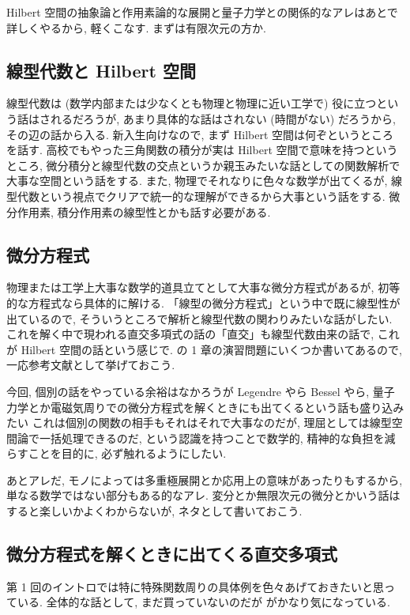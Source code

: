 \documentclass[openany, a4paper, oneside]{jsbook}
\begin{document}
Hilbert 空間の抽象論と作用素論的な展開と量子力学との関係的なアレはあとで詳しくやるから, 軽くこなす.
まずは有限次元の方か.
\subsection{線型代数と Hilbert 空間}

線型代数は (数学内部または少なくとも物理と物理に近い工学で) 役に立つという話はされるだろうが,
あまり具体的な話はされない (時間がない) だろうから, その辺の話から入る.
新入生向けなので, まず Hilbert 空間は何ぞというところを話す.
高校でもやった三角関数の積分が実は Hilbert 空間で意味を持つというところ,
微分積分と線型代数の交点というか親玉みたいな話としての関数解析で大事な空間という話をする.
また, 物理でそれなりに色々な数学が出てくるが, 線型代数という視点でクリアで統一的な理解ができるから大事という話をする.
微分作用素, 積分作用素の線型性とかも話す必要がある.
\subsection{微分方程式}

物理または工学上大事な数学的道具立てとして大事な微分方程式があるが,
初等的な方程式なら具体的に解ける.
「線型の微分方程式」という中で既に線型性が出ているので, そういうところで解析と線型代数の関わりみたいな話がしたい.
これを解く中で現われる直交多項式の話の「直交」も線型代数由来の話で, これが Hilbert 空間の話という感じで.
\cite{AraiEzawa1} の 1 章の演習問題にいくつか書いてあるので, 一応参考文献として挙げておこう.

今回, 個別の話をやっている余裕はなかろうが Legendre やら Bessel やら,
量子力学とか電磁気周りでの微分方程式を解くときにも出てくるという話も盛り込みたい
これは個別の関数の相手もそれはそれで大事なのだが, 理屈としては線型空間論で一括処理できるのだ,
という認識を持つことで数学的, 精神的な負担を減らすことを目的に, 必ず触れるようにしたい.

あとアレだ, モノによっては多重極展開とか応用上の意味があったりもするから,
単なる数学ではない部分もある的なアレ.
変分とか無限次元の微分とかいう話はすると楽しいかよくわからないが, ネタとして書いておこう.
\subsection{微分方程式を解くときに出てくる直交多項式}

第 1 回のイントロでは特に特殊関数周りの具体例を色々あげておきたいと思っている.
全体的な話として, まだ買っていないのだが \cite{KazuhikoAomoto1} がかなり気になっている.
\end{document}
